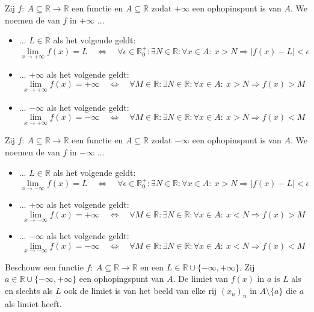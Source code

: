 \documentclass[main.tex]{subfiles}
\begin{document}
\begin{de}
  Zij $f:\ A \subseteq \mathbb{R} \rightarrow \mathbb{R}$ een functie en $A \subseteq \mathbb{R}$ zodat $+\infty$ een ophopinspunt is van $A$.
  We noemen de  van $f$ in $+\infty$ ...
  \begin{itemize}
  \item ... $L\in \mathbb{R}$ als het volgende geldt:
    \[
    \lim_{x\rightarrow +\infty}f(x) = L \quad\Leftrightarrow\quad
    \forall \epsilon \in \mathbb{R}_{0}^{+}: \exists N \in \mathbb{R}: \forall x\in A:\ x > N \Rightarrow |f(x) - L| < \epsilon
    \]
  \item ... $+\infty$ als het volgende geldt:
    \[
    \lim_{x\rightarrow +\infty}f(x) = +\infty\quad\Leftrightarrow\quad
    \forall M \in \mathbb{R}: \exists N \in \mathbb{R}: \forall x\in A:\ x > N \Rightarrow f(x) > M
    \]
  \item ... $-\infty$ als het volgende geldt:
    \[
    \lim_{x\rightarrow +\infty}f(x) = -\infty\quad\Leftrightarrow\quad
    \forall M \in \mathbb{R}: \exists N \in \mathbb{R}: \forall x\in A:\ x > N \Rightarrow f(x) < M
    \]
  \end{itemize}
\end{de}

\begin{de}
  Zij $f:\ A \subseteq \mathbb{R} \rightarrow \mathbb{R}$ een functie en $A \subseteq \mathbb{R}$ zodat $-\infty$ een ophopinspunt is van $A$.
  We noemen de  van $f$ in $-\infty$ ...
  \begin{itemize}
  \item ... $L\in \mathbb{R}$ als het volgende geldt:
    \[
    \lim_{x\rightarrow -\infty}f(x) = L \quad\Leftrightarrow\quad
    \forall \epsilon \in \mathbb{R}_{0}^{+}: \exists N \in \mathbb{R}: \forall x\in A:\ x > N \Rightarrow |f(x) - L| < \epsilon
    \]
  \item ... $+\infty$ als het volgende geldt:
    \[
    \lim_{x\rightarrow -\infty}f(x) = +\infty\quad\Leftrightarrow\quad
    \forall M \in \mathbb{R}: \exists N \in \mathbb{R}: \forall x\in A:\ x < N \Rightarrow f(x) > M
    \]
  \item ... $-\infty$ als het volgende geldt:
    \[
    \lim_{x\rightarrow -\infty}f(x) = -\infty\quad\Leftrightarrow\quad
    \forall M \in \mathbb{R}: \exists N \in \mathbb{R}: \forall x\in A:\ x < N \Rightarrow f(x) < M
    \]
  \end{itemize}
\end{de}

\begin{pr}
  Beschouw een functie $f:\ A \subseteq \mathbb{R} \rightarrow \mathbb{R}$ en een $L \in \mathbb{R} \cup \{-\infty,+\infty\}$.
  Zij $a \in \mathbb{R} \cup \{-\infty,+\infty\}$ een ophopingspunt van $A$.
  De limiet van $f(x)$ in $a$ is $L$ als en slechts als $L$ ook de limiet is van het beeld van elke rij $(x_{n})_{n}$ in $A\setminus\{a\}$ die $a$ als limiet heeft.
\end{pr}
\end{document}
